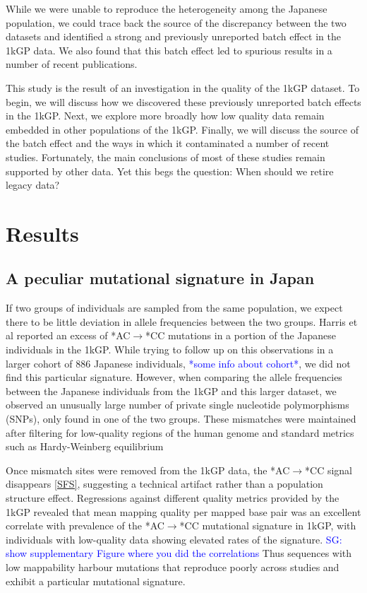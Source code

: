 \documentclass[9pt,lineno]{elife}
\newcommand{\sgcomment}[1]{\textcolor{blue}{SG: #1}}
\newcommand{\todo}[1]{\textcolor{blue}{*#1*}}
\begin{document}
While we were unable to reproduce the heterogeneity among the Japanese population, we could trace back the source of the discrepancy between the two datasets and identified a strong and previously unreported batch effect in the 1kGP data. We also found that this batch effect led to spurious results in a number of recent publications. 

This study is the result of an investigation in the quality of the 1kGP dataset. 
To begin, we will discuss how we discovered these previously unreported batch effects in the 1kGP. 
Next, we explore more broadly how low quality data remain embedded in other populations of the 1kGP. 
Finally, we will discuss the source of the batch effect and the ways in which it contaminated a number of recent studies.
Fortunately, the main conclusions of most of these studies remain supported by other data.
Yet this begs the question: When should we retire legacy data?

			\section{Results}
	\subsection{A peculiar mutational signature in Japan}			
If two groups of individuals are sampled from the same population, we expect there to be little deviation in allele frequencies between the two groups. 
Harris et al reported an excess of *AC${\rightarrow}$*CC mutations in a portion of the Japanese individuals in the 1kGP. 
While trying to follow up on this observations in a larger cohort of 886 Japanese individuals, \todo{some info about cohort}, we did not find this particular signature.
However, when comparing the allele frequencies between the Japanese individuals from the 1kGP and this larger dataset, we observed an unusually large number of private single nucleotide polymorphisms (SNPs), only found in one of the two groups. 
These mismatches were maintained after filtering for low-quality regions of the human genome and standard metrics such as Hardy-Weinberg equilibrium

Once mismatch sites were removed from the 1kGP data, the  *AC${\rightarrow}$*CC signal disappears \ref{SFS}, suggesting a technical artifact rather than a population structure effect. 
Regressions against different quality metrics provided by the 1kGP revealed that mean mapping quality per mapped base pair was an excellent correlate with prevalence of the  *AC${\rightarrow}$*CC mutational signature in 1kGP, with individuals with low-quality data showing elevated rates of the signature. 
\sgcomment{show supplementary Figure where you did the correlations}
Thus sequences with low mappability harbour mutations that reproduce poorly across studies and exhibit a particular mutational signature. 
\end{document}
